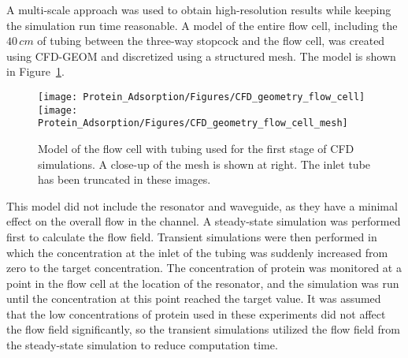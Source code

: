 A multi-scale approach was used to obtain high-resolution results
while keeping the simulation run time reasonable. A model of the entire
flow cell, including the $40\, cm$ of tubing between the three-way
stopcock and the flow cell, was created using CFD-GEOM and discretized
using a structured mesh. The model is shown in Figure~\ref{fig:CFD flow cell}.%
\begin{figure}
\texttt{[image: Protein\_Adsorption/Figures/CFD\_geometry\_flow\_cell]}\texttt{[image: Protein\_Adsorption/Figures/CFD\_geometry\_flow\_cell\_mesh]}

\caption{\label{fig:CFD flow cell}Model of the flow cell with tubing used
for the first stage of CFD simulations. A close-up of the mesh is
shown at right. The inlet tube has been truncated in these images.}


%
\end{figure}
 This model did not include the resonator and waveguide, as they have
a minimal effect on the overall flow in the channel. A steady-state
simulation was performed first to calculate the flow field. Transient
simulations were then performed in which the concentration at the
inlet of the tubing was suddenly increased from zero to the target
concentration. The concentration of protein was monitored at a point
in the flow cell at the location of the resonator, and the simulation
was run until the concentration at this point reached the target value.
It was assumed that the low concentrations of protein used in these
experiments did not affect the flow field significantly, so the transient
simulations utilized the flow field from the steady-state simulation
to reduce computation time. 

